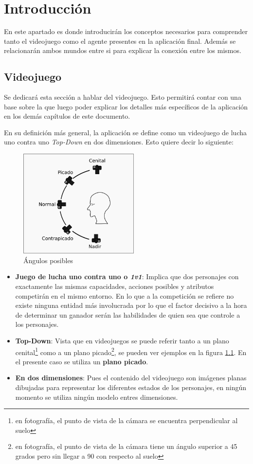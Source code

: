 \chapter{Introducción}

En este apartado es donde introducirán los conceptos necesarios para comprender tanto el videojuego como el agente presentes en la aplicación final. Además se relacionarán ambos mundos entre si para explicar la conexión entre los mismos.

\section{Videojuego}

Se dedicará esta sección a hablar del videojuego. Esto permitirá contar con una base sobre la que luego poder explicar los detalles más específicos de la aplicación en los demás capítulos de este documento.

\bigskip

En su definición más general, la aplicación se define como un videojuego de lucha uno contra uno \textit{Top-Down} en dos dimensiones. Esto quiere decir lo siguiente:

\begin{figure}
	\centerline{\includegraphics[width=6cm]{otros/manual/angulos.png}}
	\caption{Ángulos posibles}
	\label{mec:angulos}
\end{figure}

\begin{itemize}
	\item \textbf{Juego de lucha uno contra uno o \textit{1v1}}: Implica que dos personajes con exactamente las mismas capacidades, acciones posibles y atributos competirán en el mismo entorno. En lo que a la competición se refiere no existe ninguna entidad más involucrada por lo que el factor decisivo a la hora de determinar un ganador serán las habilidades de quien sea que controle a los personajes.
	\item \textbf{Top-Down}: Vista que en videojuegos se puede referir tanto a un plano cenital\footnote{en fotografía, el punto de vista de la cámara se encuentra perpendicular al suelo} como a un plano picado\footnote{en fotografía, el punto de vista de la cámara tiene un ángulo superior a 45 grados pero sin llegar a 90 con respecto al suelo}, se pueden ver ejemplos en la figura \ref{mec:angulos}. En el presente caso se utiliza un \textbf{plano picado}.
	\item \textbf{En dos dimensiones}: Pues el contenido del videojuego son imágenes planas dibujadas para representar los diferentes estados de los personajes, en ningún momento se utiliza ningún modelo entres dimensiones.
\end{itemize}

